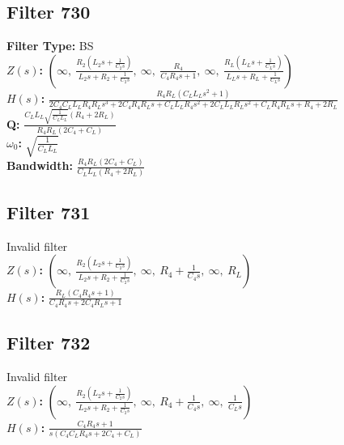 \documentclass{article}
\begin{document}
\subsection*{Filter 730}
\textbf{Filter Type:} BS \\ 
\textbf{$Z(s)$:} $\left( \infty, \  \frac{R_{2} \left(L_{2} s + \frac{1}{C_{2} s}\right)}{L_{2} s + R_{2} + \frac{1}{C_{2} s}}, \  \infty, \  \frac{R_{4}}{C_{4} R_{4} s + 1}, \  \infty, \  \frac{R_{L} \left(L_{L} s + \frac{1}{C_{L} s}\right)}{L_{L} s + R_{L} + \frac{1}{C_{L} s}}\right)$ \\ 
\textbf{$H(s)$:} $\frac{R_{4} R_{L} \left(C_{L} L_{L} s^{2} + 1\right)}{2 C_{4} C_{L} L_{L} R_{4} R_{L} s^{3} + 2 C_{4} R_{4} R_{L} s + C_{L} L_{L} R_{4} s^{2} + 2 C_{L} L_{L} R_{L} s^{2} + C_{L} R_{4} R_{L} s + R_{4} + 2 R_{L}}$ \\ 
\textbf{Q:} $\frac{C_{L} L_{L} \sqrt{\frac{1}{C_{L} L_{L}}} \left(R_{4} + 2 R_{L}\right)}{R_{4} R_{L} \left(2 C_{4} + C_{L}\right)}$ \\ 
\textbf{$\omega_0$:} $\sqrt{\frac{1}{C_{L} L_{L}}}$ \\ 
\textbf{Bandwidth:} $\frac{R_{4} R_{L} \left(2 C_{4} + C_{L}\right)}{C_{L} L_{L} \left(R_{4} + 2 R_{L}\right)}$ \\ 
\subsection*{Filter 731}
Invalid filter \\ 
\textbf{$Z(s)$:} $\left( \infty, \  \frac{R_{2} \left(L_{2} s + \frac{1}{C_{2} s}\right)}{L_{2} s + R_{2} + \frac{1}{C_{2} s}}, \  \infty, \  R_{4} + \frac{1}{C_{4} s}, \  \infty, \  R_{L}\right)$ \\ 
\textbf{$H(s)$:} $\frac{R_{L} \left(C_{4} R_{4} s + 1\right)}{C_{4} R_{4} s + 2 C_{4} R_{L} s + 1}$ \\ 
\subsection*{Filter 732}
Invalid filter \\ 
\textbf{$Z(s)$:} $\left( \infty, \  \frac{R_{2} \left(L_{2} s + \frac{1}{C_{2} s}\right)}{L_{2} s + R_{2} + \frac{1}{C_{2} s}}, \  \infty, \  R_{4} + \frac{1}{C_{4} s}, \  \infty, \  \frac{1}{C_{L} s}\right)$ \\ 
\textbf{$H(s)$:} $\frac{C_{4} R_{4} s + 1}{s \left(C_{4} C_{L} R_{4} s + 2 C_{4} + C_{L}\right)}$ \\ 
\end{document}
